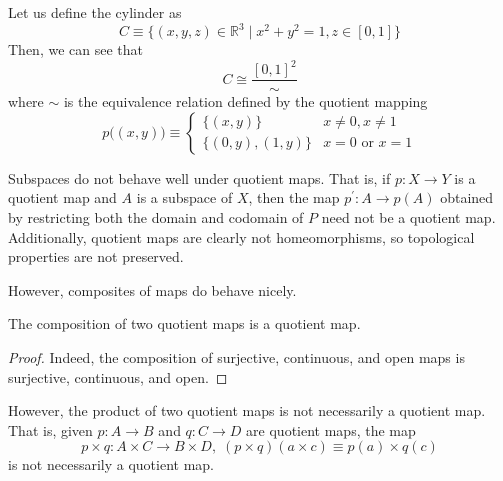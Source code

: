 \documentclass{article}
\begin{document}
    \begin{example}
    Let us define the cylinder as 
    \[C \equiv \{(x, y, z) \in \mathbb{R}^3 \; | \; x^2 + y^2 = 1, z \in [0,1]\} \]
    Then, we can see that
    \[C \cong \frac{[0,1]^2}{\sim}\]
    where $\sim$ is the equivalence relation defined by the quotient mapping 
    \[p\big((x, y)\big) \equiv \begin{cases}
          \{(x, y)\} & x \neq 0, x \neq 1 \\
          \{(0,y), (1, y)\} & x = 0 \text{ or } x = 1
    \end{cases}\]
    \end{example}

    Subspaces do not behave well under quotient maps. That is, if $p: X \longrightarrow Y$ is a quotient map and $A$ is a subspace of $X$, then the map $p^\prime: A \longrightarrow p(A)$ obtained by restricting both the domain and codomain of $P$ need not be a quotient map. Additionally, quotient maps are clearly not homeomorphisms, so topological properties are not preserved. 

    However, composites of maps do behave nicely. 

    \begin{proposition}
    The composition of two quotient maps is a quotient map. 
    \end{proposition}
    \begin{proof}
    Indeed, the composition of surjective, continuous, and open maps is surjective, continuous, and open. 
    \end{proof}

    However, the product of two quotient maps is not necessarily a quotient map. That is, given $p: A \longrightarrow B$ and $q: C \longrightarrow D$ are quotient maps, the map 
    \[p \times q: A \times C \longrightarrow B \times D, \; (p \times q) (a \times c) \equiv p(a) \times q(c)\]
    is not necessarily a quotient map. 
\end{document}
